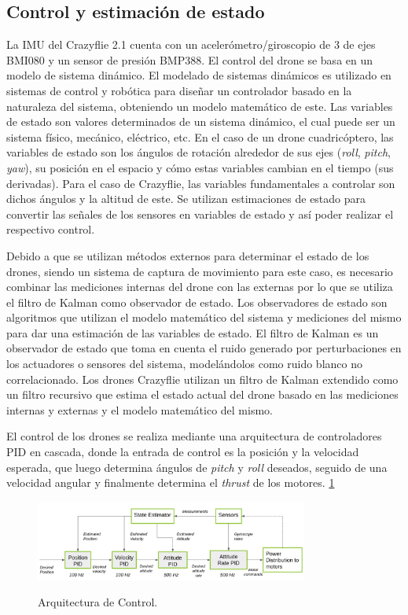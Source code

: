 \subsection*{Control y estimación de estado}
La IMU del Crazyflie 2.1 cuenta con un acelerómetro/giroscopio de 3 de ejes BMI080 y un sensor de presión BMP388. El control del drone se basa en un modelo de sistema dinámico. El modelado de sistemas dinámicos es utilizado en sistemas de control y robótica para diseñar un controlador basado en la naturaleza del sistema, obteniendo un modelo matemático de este. Las variables de estado son valores determinados de un sistema dinámico, el cual puede ser un sistema físico, mecánico, eléctrico, etc. En el caso de un drone cuadricóptero, las variables de estado son los ángulos de rotación alrededor de sus ejes (\emph{roll}, \emph{pitch}, \emph{yaw}), su posición en el espacio y cómo estas variables cambian en el tiempo (sus derivadas). Para el caso de Crazyflie, las variables fundamentales a controlar son dichos ángulos y la altitud de este. Se utilizan estimaciones de estado para convertir las señales de los sensores en variables de estado y así poder realizar el respectivo control.  

Debido a que se utilizan métodos externos para determinar el estado de los drones, siendo un sistema de captura de movimiento para este caso, es necesario combinar las mediciones internas del drone con las externas por lo que se utiliza el filtro de Kalman como observador de estado. Los observadores de estado son algoritmos que utilizan el modelo matemático del sistema y mediciones del mismo para dar una estimación de las variables de estado. El filtro de Kalman es un observador de estado que toma en cuenta el ruido generado por perturbaciones en los actuadores o sensores del sistema, modelándolos como ruido blanco no correlacionado. Los drones Crazyflie utilizan un filtro de Kalman extendido como un filtro recursivo que estima el estado actual del drone basado en las mediciones internas y externas y el modelo matemático del mismo. \cite{Kalman}

El control de los drones se realiza mediante una arquitectura de controladores PID en cascada, donde la entrada de control es la posición y la velocidad esperada, que luego determina ángulos de \emph{pitch} y \emph{roll} deseados, seguido de una velocidad angular y finalmente determina el \emph{thrust} de los motores. \ref{fig:PID}
\begin{figure}[t]
    \centering
    \includegraphics[width=0.8\textwidth]{figuras/cascaded_pid_controller.png}
    \caption{Arquitectura de Control.}
    \cite{Kalman}
    \label{fig:PID}
\end{figure}

